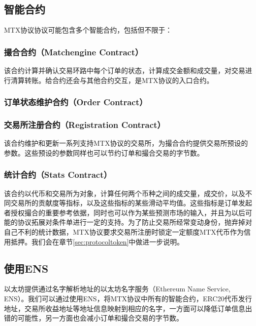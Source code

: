 \documentclass[UTF8,nofonts]{ctexart}
\begin{document}
\subsection{智能合约\label{sec:contracts}}

MTX协议协议可能包含多个智能合约，包括但不限于：

\subsubsection{撮合合约（Matchengine Contract）} 

该合约计算并确认交易环路中每个订单的状态，计算成交金额和成交量，对交易进行清算转账。给合约还会与其他合约交互，是MTX协议的入口合约。

\subsubsection{订单状态维护合约（Order Contract）}

\subsubsection{交易所注册合约（Registration Contract）}
该合约维护和更新一系列支持MTX协议的交易所，为撮合合约提供交易所预设的参数。这些预设的参数同样也可以节约订单和撮合交易的字节数。

\subsubsection{统计合约（Stats Contract）} 该合约以代币和交易所为对象，计算任何两个币种之间的成交量，成交价，以及不同交易所的贡献度等指标，以及这些指标的某些滑动平均值。这些指标是订单发起者授权撮合的重要参考依据，同时也可以作为某些预测市场的输入，并且为以后可能的协议拓展对条件单进行一定的支持。为了防止交易所经常变动身份，抛弃掉对自己不利的统计数据，MTX协议要求交易所注册时锁定一定额度MTX代币作为信用抵押。我们会在章节\ref{sec:protocoltoken}中做进一步说明。

\subsection{使用ENS\label{sec:registration}}

以太坊提供通过名字解析地址的以太坊名字服务（Ethereum Name Service, ENS）\cite{hirai2016formal}。我们可以通过使用ENS，将MTX协议中所有的智能合约，ERC20代币发行地址，交易所收益地址等地址信息映射到相应的名字，一方面可以降低订单信息出错的可能性，另一方面也会减小订单和撮合交易的字节数。
\end{document}
